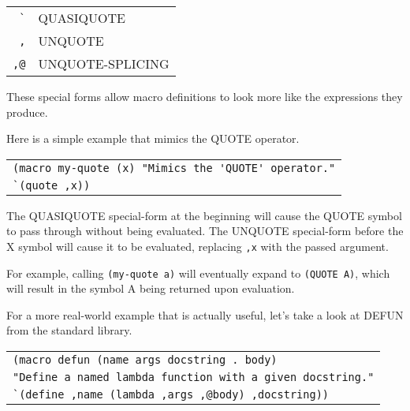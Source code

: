 \documentclass[
letterpaper,
oneside,
]{memoir}
\begin{document}
\begin{center}
  \begin{tabular}{rl}
    \verb|`|  & QUASIQUOTE \\
    \verb|,|  & UNQUOTE \\
    \verb|,@| & UNQUOTE-SPLICING \\
  \end{tabular}
\end{center}

\noindent
These special forms allow macro definitions to look more like the expressions they produce.

\filbreak

\vspace{1em}
\noindent
Here is a simple example that mimics the QUOTE operator.

\vspace{1em}
\begin{tabular}{l}
  \verb|(macro my-quote (x) "Mimics the 'QUOTE' operator."| \\
  \qquad\verb|`(quote ,x))| \\
\end{tabular}
\vspace{1em}

\noindent
The QUASIQUOTE special-form at the beginning will cause the QUOTE symbol to pass through without being evaluated. The UNQUOTE special-form before the X symbol will cause it to be evaluated, replacing \texttt{,x} with the passed argument.

\filbreak

\vspace{1em}
\noindent
For example, calling \texttt{(my-quote a)} will eventually expand to \texttt{(QUOTE A)}, which will result in the symbol A being returned upon evaluation.

\filbreak

\vspace{1em}
\noindent
For a more real-world example that is actually useful, let’s take a look at DEFUN from the standard library.

\vspace{1em}
\begin{tabular}{l}
  \verb|(macro defun (name args docstring . body)| \\
  \qquad\verb|"Define a named lambda function with a given docstring."| \\
  \qquad\verb|`(define ,name (lambda ,args ,@body) ,docstring))| \\
\end{tabular}
\vspace{1em}
\end{document}
